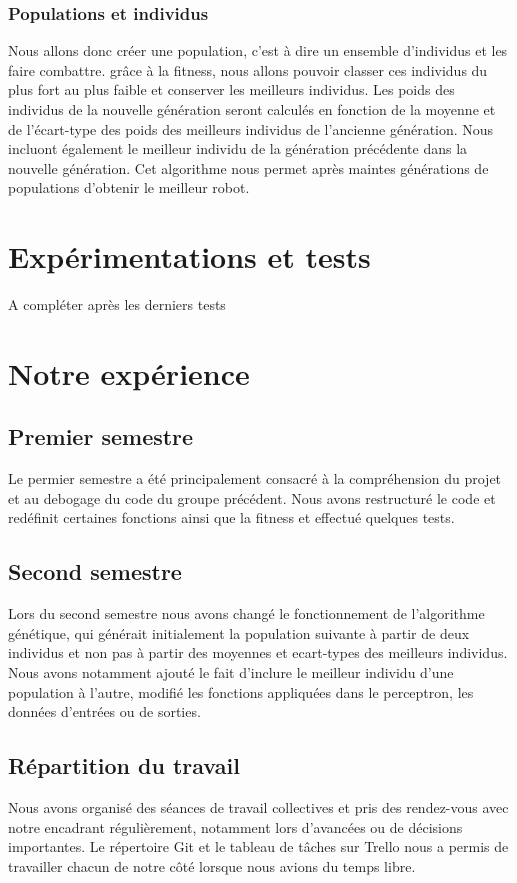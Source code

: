 \documentclass[12pt]{article}
\begin{document}
\subsubsection{Populations et individus}
Nous allons donc créer une population, c'est à dire un ensemble d'individus et les faire combattre. grâce à la fitness, nous allons pouvoir classer ces individus du plus fort au plus faible et conserver les meilleurs individus. Les poids des individus de la nouvelle génération seront calculés en fonction de la moyenne et de l'écart-type des poids des meilleurs individus de l'ancienne génération. Nous incluont également le meilleur individu de la génération précédente dans la nouvelle génération. Cet algorithme nous permet après maintes générations de populations d'obtenir le meilleur robot.

\newpage

\section{Expérimentations et tests}
A compléter après les derniers tests

\newpage

\section{Notre expérience}

\subsection{Premier semestre}
Le permier semestre a été principalement consacré à la compréhension du projet et au debogage du code du groupe précédent. Nous avons restructuré le code et redéfinit certaines fonctions ainsi que la fitness et effectué quelques tests.

\subsection{Second semestre}
Lors du second semestre nous avons changé le fonctionnement de l'algorithme génétique, qui générait initialement la population suivante à partir de deux individus et non pas à partir des moyennes et ecart-types des meilleurs individus. Nous avons notamment ajouté le fait d'inclure le meilleur individu d'une population à l'autre, modifié les fonctions appliquées dans le perceptron, les données d'entrées ou de sorties.

\subsection{Répartition du travail}
Nous avons organisé des séances de travail collectives et pris des rendez-vous avec notre encadrant régulièrement, notamment lors d'avancées ou de décisions importantes. Le répertoire Git et le tableau de tâches sur Trello nous a permis de travailler chacun de notre côté lorsque nous avions du temps libre.
\end{document}
